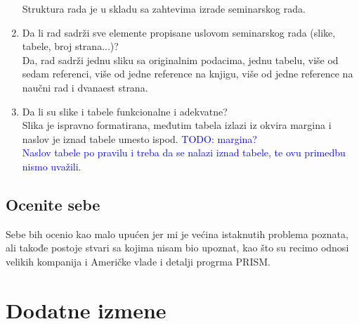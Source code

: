 \documentclass[a4paper]{report}
\newcommand{\odgovor}[1]{\textcolor{blue}{#1}}
\begin{document}
\begin{enumerate}
Struktura rada je u skladu sa zahtevima izrade seminarskog rada.
\item Da li rad sadrži sve elemente propisane uslovom seminarskog rada (slike, tabele, broj strana...)?\\
Da, rad sadrži jednu sliku sa originalnim podacima, jednu tabelu, više od sedam referenci, više od jedne reference na knjigu, više od jedne reference na naučni rad i dvanaest strana.
\item Da li su slike i tabele funkcionalne i adekvatne?\\
Slika je ispravno formatirana, međutim tabela izlazi iz okvira margina i naslov je iznad tabele umesto ispod.
\odgovor{TODO: margina? \\ Naslov tabele po pravilu i treba da se nalazi iznad tabele, te ovu primedbu nismo uvažili.}
\end{enumerate}

\section{Ocenite sebe}
Sebe bih ocenio kao malo upućen jer mi je većina istaknutih problema poznata, ali takođe postoje stvari sa kojima nisam bio upoznat, kao što su recimo odnosi velikih kompanija i Američke vlade i detalji progrma PRISM.



\chapter{Dodatne izmene}
\end{document}
